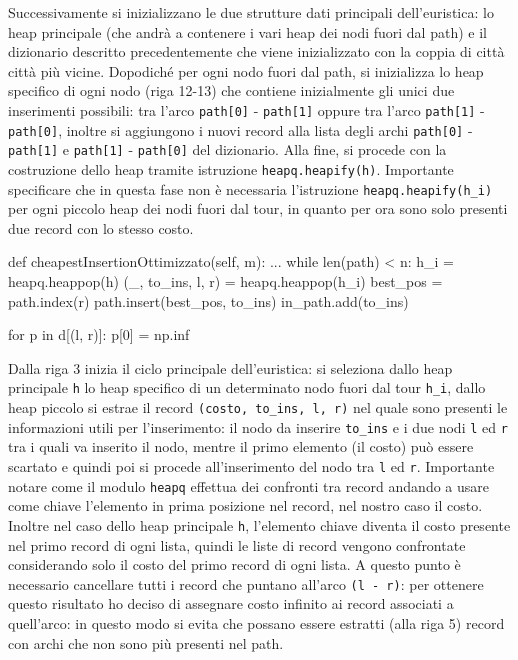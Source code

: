 \documentclass[a4paper,12pt]{report}
\begin{document}
Successivamente si inizializzano le due strutture dati principali dell'euristica: lo heap principale (che andrà a contenere i vari heap dei nodi fuori dal path) e il dizionario descritto precedentemente che viene inizializzato con la coppia di città città più vicine. Dopodiché per ogni nodo fuori dal path, si inizializza lo heap specifico di ogni nodo (riga 12-13) che contiene inizialmente gli unici due inserimenti possibili: tra l'arco \lstinline!path[0]! - \lstinline!path[1]! oppure tra l'arco \lstinline!path[1]! - \lstinline!path[0]!, inoltre si aggiungono i nuovi record alla lista degli archi \lstinline!path[0]! - \lstinline!path[1]! e \lstinline!path[1]! - \lstinline!path[0]! del dizionario. Alla fine, si procede con la costruzione dello heap tramite istruzione \lstinline!heapq.heapify(h)!. Importante specificare che in questa fase non è necessaria l'istruzione \lstinline!heapq.heapify(h_i)! per ogni piccolo heap dei nodi fuori dal tour, in quanto per ora sono solo presenti due record con lo stesso costo.
\begin{python}
def cheapestInsertionOttimizzato(self, m):
  ...
  while len(path) < n:
    h_i = heapq.heappop(h)
    (_, to_ins, l, r) = heapq.heappop(h_i)
    best_pos = path.index(r)
    path.insert(best_pos, to_ins)
    in_path.add(to_ins)

    for p in d[(l, r)]:
      p[0] = np.inf
\end{python}
Dalla riga 3 inizia il ciclo principale dell'euristica: si seleziona dallo heap principale \lstinline!h! lo heap specifico di un determinato nodo fuori dal tour \lstinline!h_i!, dallo heap piccolo si estrae il record \lstinline!(costo, to_ins, l, r)! nel quale sono presenti le informazioni utili per l'inserimento: il nodo da inserire \lstinline!to_ins! e i due nodi \lstinline!l! ed \lstinline!r! tra i quali va inserito il nodo, mentre il primo elemento (il costo) può essere scartato e quindi poi si procede all'inserimento del nodo tra \lstinline!l! ed \lstinline!r!. Importante notare come il modulo \lstinline!heapq! effettua dei confronti tra record andando a usare come chiave l'elemento in prima posizione nel record, nel nostro caso il costo. Inoltre nel caso dello heap principale \lstinline!h!, l'elemento chiave diventa il costo presente nel primo record di ogni lista, quindi le liste di record vengono confrontate considerando solo il costo del primo record di ogni lista. A questo punto è necessario cancellare tutti i record che puntano all'arco \lstinline!(l - r)!: per ottenere questo risultato ho deciso di assegnare costo infinito ai record associati a quell'arco: in questo modo si evita che possano essere estratti (alla riga 5) record con archi che non sono più presenti nel path.
\end{document}

